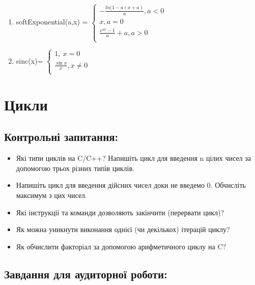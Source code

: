\documentclass[a5paper,titlepage,openany,twoside,draft]{book_unv}%
\makeatletter
\newcommand{\xslalph}[1]{\expandafter\@xslalph\csname c@#1\endcsname}
\newcommand{\@xslalph}[1]{%
    \ifcase#1\or а\or б\or в\or г\or д\or e\or є\or ж\or з\or i%
    \or й\or к\or л\or м\or н\or о\or п\or р\or с\or т%
    \or у\or ф\or х\or ц\or ч\or ш\or ю\or я\or аа\or бб\or вв%
    \else\@ctrerr\fi%
}
\makeatother
\begin{document}
\begin{enumerate}
\begin{enumerate}[label=\xslalph*)]
\item 
softExponential(a,x) = \(\left\{ \begin{matrix}
 - \frac{ln(1 - a(x + a)}{a},a < 0 \\
x,a = 0 \\
\frac{e^{\text{ax}} - 1}{a} + a,a > 0 \\
\end{matrix} \right.\ \)

\item 
sinc(x)= \(\left\{ \begin{matrix}
1,\ x = 0 \\
\frac{\sin x}{x},x \neq 0 \\
\end{matrix} \right.\ \)

 \end{enumerate}
\end{enumerate}


\chapter{ Цикли }
%

\section{Контрольні запитання:}
\begin{itemize}
\item
  Які типи циклів на C/C++? Напишіть цикл для введення n цілих чисел
  за допомогою трьох різних типів циклів.
\item
  Напишіть цикл для введення дійсних чисел доки не введемо 0. Обчисліть
  максимум з цих чисел.
\item
  Які інструкції та команди дозволяють закінчити (перервати цикл)?
\item
  Як можна уникнути виконання однієї (чи декількох) ітерацій циклу?
\item
  Як обчислити факторіал за допомогою арифметичного циклу на C?
\end{itemize}

\section{Завдання для аудиторної роботи:}
\end{document}
